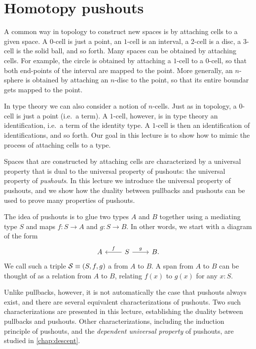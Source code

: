 \chapter{Homotopy pushouts}

A common way in topology to construct new spaces is by attaching cells to a given space. A $0$-cell is just a point, an $1$-cell is an interval, a $2$-cell is a disc, a $3$-cell is the solid ball, and so forth. Many spaces can be obtained by attaching cells. For example, the circle is obtained by attaching a $1$-cell to a $0$-cell, so that both end-points of the interval are mapped to the point. More generally, an $n$-sphere is obtained by attaching an $n$-disc to the point, so that its entire boundar gets mapped to the point.

In type theory we can also consider a notion of $n$-cells. Just as in topology, a $0$-cell is just a point (i.e.~a term). A $1$-cell, however, is in type theory an identification, i.e.~a term of the identity type. A $1$-cell is then an identification of identifications, and so forth. Our goal in this lecture is to show how to mimic the process of attaching cells to a type.

Spaces that are constructed by attaching cells are characterized by a universal property that is dual to the universal property of pushouts: the universal property of \emph{pushouts}. In this lecture we introduce the universal property of pushouts, and we show how the duality between pullbacks and pushouts can be used to prove many properties of pushouts.

The idea of pushouts is to glue two types $A$ and $B$ together using a mediating type $S$ and maps $f:S\to A$ and $g:S\to B$. In other words, we start with a diagram of the form
\begin{equation*}
\begin{tikzcd}
A & S \arrow[l,swap,"f"] \arrow[r,"g"] & B.
\end{tikzcd}
\end{equation*}
We call such a triple $\mathcal{S}\equiv (S,f,g)$ a  from $A$ to $B$.
A span from $A$ to $B$ can be thought of as a relation from $A$ to $B$, relating $f(x)$ to $g(x)$ for any $x:S$.

Unlike pullbacks, however, it is not automatically the case that pushouts always exist, and there are several equivalent characterizations of pushouts. Two such characterizations are presented in this lecture, establishing the duality between pullbacks and pushouts. Other characterizations, including the induction principle of pushouts, and the \emph{dependent universal property} of pushouts, are studied in \cref{chap:descent}.

